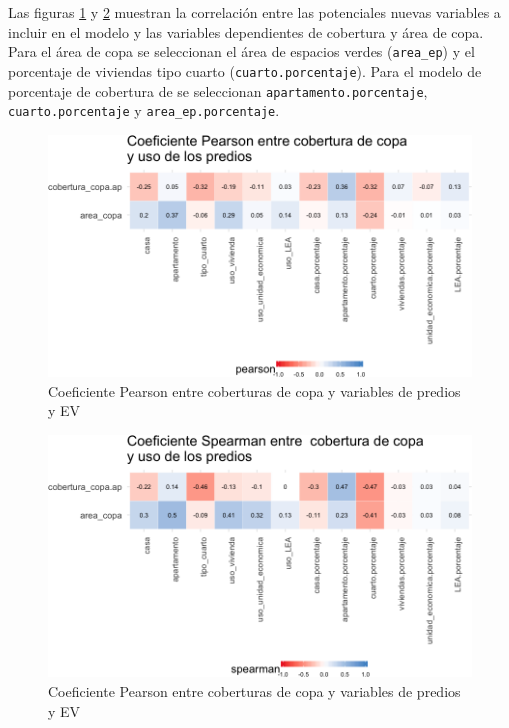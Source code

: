 \documentclass[12pt,]{book}
\begin{document}
Las figuras \ref{fig:tile-copa-prediosev-pearson} y
\ref{fig:tile-copa-prediosev-spearman} muestran la correlación entre las
potenciales nuevas variables a incluir en el modelo y las variables
dependientes de cobertura y área de copa. Para el área de copa se
seleccionan el área de espacios verdes (\texttt{area\_ep}) y el
porcentaje de viviendas tipo cuarto (\texttt{cuarto.porcentaje}). Para
el modelo de porcentaje de cobertura de se seleccionan
\texttt{apartamento.porcentaje}, \texttt{cuarto.porcentaje} y
\texttt{area\_ep.porcentaje}.

\begin{figure}
\includegraphics[width=1\linewidth]{tesis-unigis_files/figure-latex/tile-copa-prediosev-pearson-1} \caption{Coeficiente Pearson entre coberturas de copa
 y variables de predios y EV}\label{fig:tile-copa-prediosev-pearson}
\end{figure}

\begin{figure}
\includegraphics[width=1\linewidth]{tesis-unigis_files/figure-latex/tile-copa-prediosev-spearman-1} \caption{Coeficiente Pearson entre coberturas de copa
 y variables de predios y EV}\label{fig:tile-copa-prediosev-spearman}
\end{figure}
\end{document}
